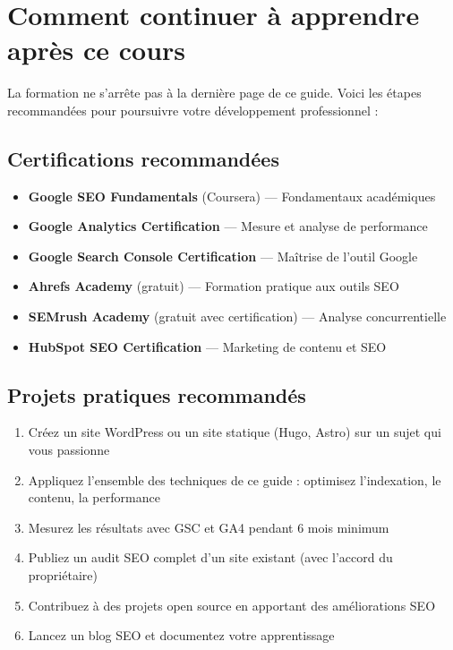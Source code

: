 \documentclass[12pt,a4paper,twoside]{report}
\newcommand{\keyword}[1]{\textbf{\textcolor{googleblue}{#1}}}
\begin{document}
\section*{Comment continuer à apprendre après ce cours}

La formation ne s'arrête pas à la dernière page de ce guide. Voici les étapes recommandées pour poursuivre votre développement professionnel :

\subsection*{Certifications recommandées}
\begin{itemize}
    \item \keyword{Google SEO Fundamentals} (Coursera) — Fondamentaux académiques
    \item \keyword{Google Analytics Certification} — Mesure et analyse de performance
    \item \keyword{Google Search Console Certification} — Maîtrise de l'outil Google
    \item \keyword{Ahrefs Academy} (gratuit) — Formation pratique aux outils SEO
    \item \keyword{SEMrush Academy} (gratuit avec certification) — Analyse concurrentielle
    \item \keyword{HubSpot SEO Certification} — Marketing de contenu et SEO
\end{itemize}

\subsection*{Projets pratiques recommandés}
\begin{enumerate}
    \item Créez un site WordPress ou un site statique (Hugo, Astro) sur un sujet qui vous passionne
    \item Appliquez l'ensemble des techniques de ce guide : optimisez l'indexation, le contenu, la performance
    \item Mesurez les résultats avec GSC et GA4 pendant 6 mois minimum
    \item Publiez un audit SEO complet d'un site existant (avec l'accord du propriétaire)
    \item Contribuez à des projets open source en apportant des améliorations SEO
    \item Lancez un blog SEO et documentez votre apprentissage
\end{enumerate}
\end{document}
